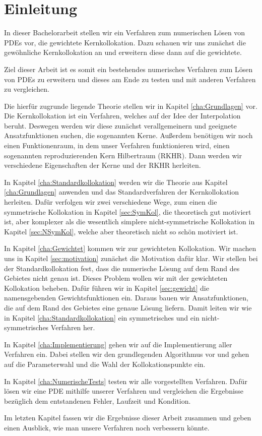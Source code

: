 \chapter{Einleitung}
\label{cha:Einleitung}
In dieser Bachelorarbeit stellen wir ein Verfahren zum numerischen Lösen von \acp{PDE} vor, die gewichtete Kernkollokation. Dazu schauen wir uns zunächst die gewöhnliche Kernkollokation an und erweitern diese dann auf die gewichtete.

Ziel dieser Arbeit ist es somit ein bestehendes numerisches Verfahren zum Lösen von \acp{PDE} zu erweitern und dieses am Ende zu testen und mit anderen Verfahren zu vergleichen.

Die hierfür zugrunde liegende Theorie stellen wir in Kapitel \ref{cha:Grundlagen} vor. Die Kernkollokation ist ein Verfahren, welches auf der Idee der Interpolation beruht. Deswegen werden wir diese zunächst verallgemeinern und geeignete Ansatzfunktionen suchen, die sogenannten Kerne. Außerdem benötigen wir noch einen Funktionenraum, in dem unser Verfahren \glqq funktionieren\grqq{} wird, einen sogenannten reproduzierenden Kern Hilbertraum (\acs{RKHR}).  Dann werden wir verschiedene Eigenschaften der Kerne und der \ac{RKHR} herleiten.

In Kapitel \ref{cha:Standardkollokation} werden wir die Theorie aus Kapitel \ref{cha:Grundlagen} anwenden und das Standardverfahren der Kernkollokation herleiten. Dafür verfolgen wir zwei verschiedene Wege, zum einen die symmetrische Kollokation in Kapitel \ref{sec:SymKol}, die theoretisch gut motiviert ist, aber komplexer als die wesentlich simplere nicht-symmetrische Kollokation in Kapitel \ref{sec:NSymKol}, welche aber theoretisch nicht so schön motiviert ist.

In Kapitel \ref{cha:Gewichtet} kommen wir zur gewichteten Kollokation. Wir machen uns in Kapitel \ref{sec:motivation} zunächst die Motivation dafür klar. Wir stellen bei der Standardkollokation fest, dass die numerische Lösung auf dem Rand des Gebietes nicht genau ist. Dieses Problem wollen wir mit der gewichteten Kollokation beheben. Dafür führen wir in Kapitel \ref{sec:gewicht} die namensgebenden Gewichtsfunktionen ein. Daraus bauen wir Ansatzfunktionen, die auf dem Rand des Gebietes eine genaue Lösung liefern. Damit leiten wir wie in Kapitel \ref{cha:Standardkollokation} ein symmetrisches und ein nicht-symmetrisches Verfahren her.

In Kapitel \ref{cha:Implementierung} gehen wir auf die Implementierung aller Verfahren ein. Dabei stellen wir den grundlegenden Algorithmus vor und gehen auf die Parameterwahl und die Wahl der Kollokationspunkte ein.

In Kapitel \ref{cha:NumerischeTests} testen wir alle vorgestellten Verfahren. Dafür lösen wir eine \ac{PDE} mithilfe unserer Verfahren und vergleichen die Ergebnisse bezüglich dem entstandenen Fehler, Laufzeit und Kondition.

Im letzten Kapitel fassen wir die Ergebnisse dieser Arbeit zusammen und geben einen Ausblick, wie man unsere Verfahren noch verbessern könnte.

\glsresetall